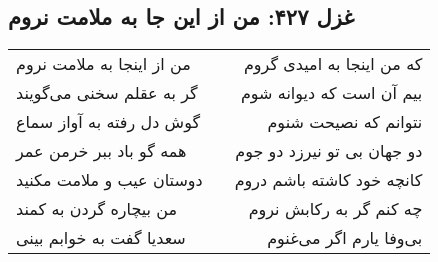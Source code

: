 \begin{center}
\section*{غزل ۴۲۷: من از این جا به ملامت نروم}
\label{sec:427}
\begin{longtable}{l p{0.5cm} r}
من از اینجا به ملامت نروم
&&
که من اینجا به امیدی گروم
\\
گر به عقلم سخنی می‌گویند
&&
بیم آن است که دیوانه شوم
\\
گوش دل رفته به آواز سماع
&&
نتوانم که نصیحت شنوم
\\
همه گو باد ببر خرمن عمر
&&
دو جهان بی تو نیرزد دو جوم
\\
دوستان عیب و ملامت مکنید
&&
کانچه خود کاشته باشم دروم
\\
من بیچاره گردن به کمند
&&
چه کنم گر به رکابش نروم
\\
سعدیا گفت به خوابم بینی
&&
بی‌وفا یارم اگر می‌غنوم
\\
\end{longtable}
\end{center}
